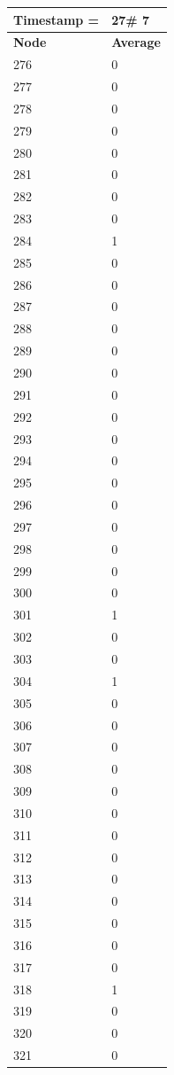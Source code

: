 \begin{tabular}{|l||l|}
\hline
\textbf{Timestamp =} & \textbf{27}\# 7\\\hline
	\textbf{Node} & \textbf{Average} \\ \hline
\hline
	276 & 0 \\ \hline
	277 & 0 \\ \hline
	278 & 0 \\ \hline
	279 & 0 \\ \hline
	280 & 0 \\ \hline
	281 & 0 \\ \hline
	282 & 0 \\ \hline
	283 & 0 \\ \hline
	284 & 1 \\ \hline
	285 & 0 \\ \hline
	286 & 0 \\ \hline
	287 & 0 \\ \hline
	288 & 0 \\ \hline
	289 & 0 \\ \hline
	290 & 0 \\ \hline
	291 & 0 \\ \hline
	292 & 0 \\ \hline
	293 & 0 \\ \hline
	294 & 0 \\ \hline
	295 & 0 \\ \hline
	296 & 0 \\ \hline
	297 & 0 \\ \hline
	298 & 0 \\ \hline
	299 & 0 \\ \hline
	300 & 0 \\ \hline
	301 & 1 \\ \hline
	302 & 0 \\ \hline
	303 & 0 \\ \hline
	304 & 1 \\ \hline
	305 & 0 \\ \hline
	306 & 0 \\ \hline
	307 & 0 \\ \hline
	308 & 0 \\ \hline
	309 & 0 \\ \hline
	310 & 0 \\ \hline
	311 & 0 \\ \hline
	312 & 0 \\ \hline
	313 & 0 \\ \hline
	314 & 0 \\ \hline
	315 & 0 \\ \hline
	316 & 0 \\ \hline
	317 & 0 \\ \hline
	318 & 1 \\ \hline
	319 & 0 \\ \hline
	320 & 0 \\ \hline
	321 & 0 \\ \hline
\end{tabular}
